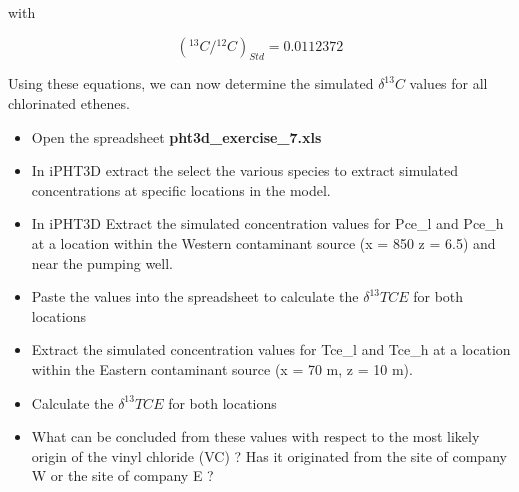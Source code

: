 with 

\begin{equation}
{ ({^{13}C} / {^{12}C})_{Std} = 0.0112372 }
\label{eq:vpdb_std}
\end{equation}

Using these equations, we can now determine the simulated $\delta ^{13}C$ values for
all chlorinated ethenes. 

\begin{itemize}

\item Open the spreadsheet {\color{red} \textbf{pht3d\_exercise\_7.xls}} 

\item In iPHT3D extract the select the various species to extract simulated concentrations at specific locations in the model.

\item In iPHT3D Extract the simulated concentration values for Pce\_l and Pce\_h at a location within the Western contaminant source (x = 850 z = 6.5) and near the pumping well.

\item Paste the values into the spreadsheet to calculate the $\delta ^{13}TCE$ for both locations 
 
\item Extract the simulated concentration values for Tce\_l and Tce\_h at a location within the Eastern contaminant source 
(x = 70 m, z = 10 m).

\item Calculate the $\delta ^{13}TCE$ for both locations 

\item What can be concluded from these values with respect to the most likely origin of the vinyl chloride (VC) ?
Has it originated from the site of company W or the site of company E ?

\end{itemize} 

